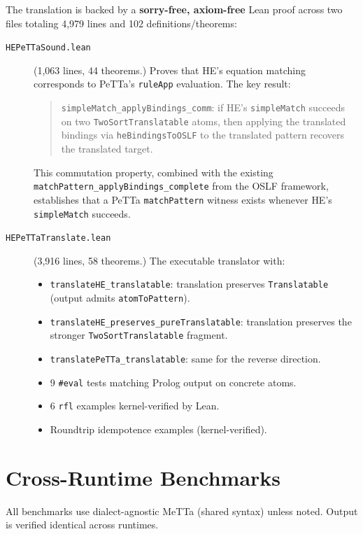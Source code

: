 \documentclass[11pt]{article}
\newcommand{\code}[1]{\texttt{#1}}
\newcommand{\PeTTa}{\textup{PeTTa}}
\newcommand{\HE}{\textup{HE}}
\begin{document}
The translation is backed by a \textbf{sorry-free, axiom-free} Lean
proof across two files totaling 4{,}979 lines and 102
definitions/theorems:

\begin{description}
\item[\code{HEPeTTaSound.lean}] (1{,}063 lines, 44 theorems.)
  Proves that \HE{}'s equation matching corresponds to \PeTTa{}'s
  \code{ruleApp} evaluation.  The key result:
  \begin{quote}
  \code{simpleMatch\_applyBindings\_comm}: if \HE{}'s
  \code{simpleMatch} succeeds on two \code{TwoSortTranslatable} atoms,
  then applying the translated bindings via \code{heBindingsToOSLF} to
  the translated pattern recovers the translated target.
  \end{quote}
  This commutation property, combined with the existing
  \code{matchPattern\_applyBindings\_complete} from the OSLF framework,
  establishes that a \PeTTa{} \code{matchPattern} witness exists
  whenever \HE{}'s \code{simpleMatch} succeeds.

\item[\code{HEPeTTaTranslate.lean}] (3{,}916 lines, 58 theorems.)
  The executable translator with:
  \begin{itemize}
  \item \code{translateHE\_translatable}: translation preserves
    \code{Translatable} (output admits \code{atomToPattern}).
  \item \code{translateHE\_preserves\_pureTranslatable}: translation
    preserves the stronger \code{TwoSortTranslatable} fragment.
  \item \code{translatePeTTa\_translatable}: same for the reverse
    direction.
  \item 9 \code{\#eval} tests matching Prolog output on concrete atoms.
  \item 6 \code{rfl} examples kernel-verified by Lean.
  \item Roundtrip idempotence examples (kernel-verified).
  \end{itemize}
\end{description}

\section{Cross-Runtime Benchmarks}

All benchmarks use dialect-agnostic MeTTa (shared syntax) unless noted.
Output is verified identical across runtimes.
\end{document}
